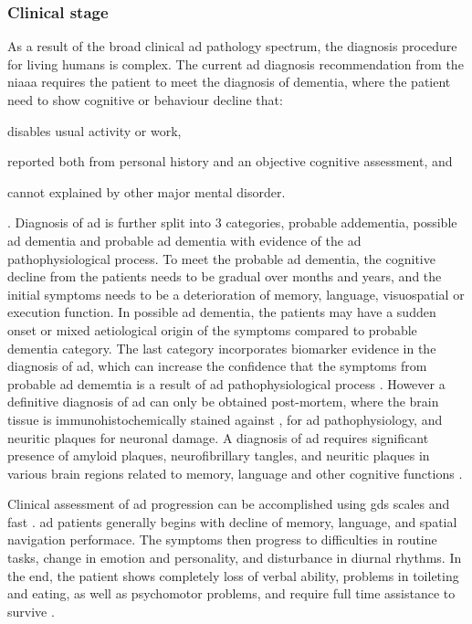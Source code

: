 \subsubsection{Clinical stage}
As a result of the broad clinical \gls{ad} pathology spectrum, the diagnosis procedure for living humans is complex. The current \gls{ad} diagnosis recommendation from the \gls{niaaa} requires the patient to meet the diagnosis of dementia, where the patient need to show cognitive or behaviour decline that:
\begin{enumerate*}[label={\alph*)}, font={\bfseries}]
    \item disables usual activity or work, 
    \item reported both from personal history and an objective cognitive assessment, and
    \item cannot explained by other major mental disorder.
\end{enumerate*} \citep{mckhann11}.
Diagnosis of \gls{ad} is further split into 3 categories, probable \gls{ad}dementia, possible \gls{ad} dementia and probable \gls{ad} dementia with evidence of the \gls{ad} pathophysiological process. To meet the probable \gls{ad} dementia, the cognitive decline from the patients needs to be gradual over months and years, and the initial symptoms needs to be a deterioration of memory, language, visuospatial or execution function. In possible \gls{ad} dementia, the patients may have a sudden onset or mixed aetiological origin of the symptoms compared to probable dementia category. The last category incorporates biomarker evidence in the diagnosis of \gls{ad}, which can increase the confidence that the symptoms from probable \gls{ad} dememtia is a result of \gls{ad} pathophysiological process \citep{mckhann11}. However a definitive diagnosis of \gls{ad} can only be obtained post-mortem, where the brain tissue is immunohistochemically stained against \abeta, \atau for \gls{ad} pathophysiology, and neuritic plaques for neuronal damage. A diagnosis of \gls{ad} requires significant presence of amyloid plaques, neurofibrillary tangles, and neuritic plaques in various brain regions related to memory, language and other cognitive functions \citep{hyman12}.

Clinical assessment of \gls{ad} progression can be accomplished using \gls{gds} scales \citep{reisberg82} and \gls{fast} \citep{sclan92}. \gls{ad} patients generally begins with decline of memory, language, and spatial navigation performace. The symptoms then progress to difficulties in routine tasks, change in emotion and personality, and disturbance in diurnal rhythms. In the end, the patient shows completely loss of verbal ability, problems in toileting and eating, as well as psychomotor problems, and require full time assistance to survive \citep{reisberg82, sclan92}.

